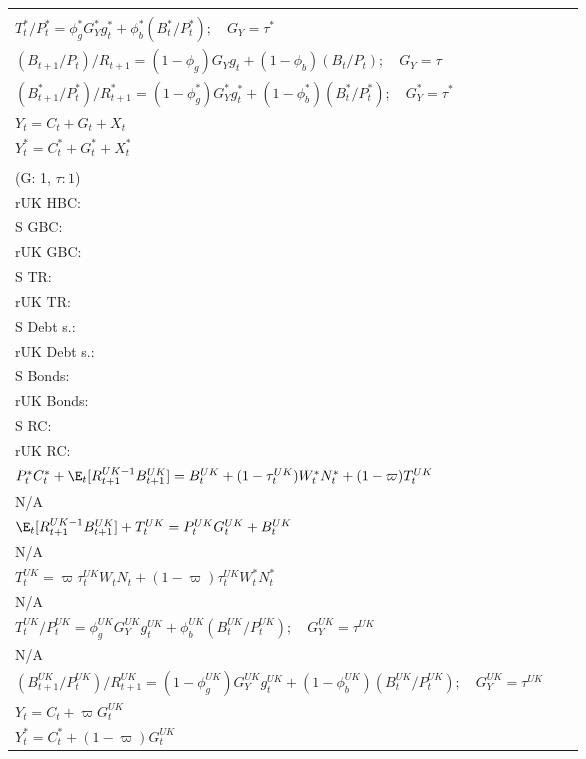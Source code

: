 \begin{table}[H]
\begin{tabular}{l|l c}
{        $T_t / P_t = \phi^*_g G_Y g_t + \phi^*_b(B_t / P_t); \quad G_Y = \tau$\\
        $T^*_t / P^*_t = \phi^*_g G^*_Y g^*_t + \phi^*_b(B^*_t / P^*_t); \quad G_Y = \tau^*$\\
        $(B_{t+1} / P_t) / R_{t+1} = (1-\phi_g) G_Y g_t + (1-\phi_b)(B_t / P_t); \quad G_Y = \tau$\\
        $(B^*_{t+1} / P^*_t) / R^*_{t+1} = (1-\phi^*_g) G^*_Y g^*_t + (1-\phi^*_b)(B^*_t / P^*_t); \quad G^*_Y = \tau^*$\\
        $Y_t = C_t + G_t + X_t$ \\
        $Y^*_t = C^*_t + G^*_t + X^*_t$
    }  \\
    \makecell{Scenario 4 \\ (G: 1, $\tau: 1$)} &  \makecell{S HBC: \\ rUK HBC: \\ S GBC: \\ rUK GBC: \\ S TR: \\ rUK TR: \\ S Debt s.:\\ rUK Debt s.:\\ S Bonds: \\ rUK Bonds: \\ S RC: \\ rUK RC:} & 
    \makecell{
        $P_t C_t + \E_t [{R^{UK-1}_{t+1}}B^{UK}_{t+1}] = B^{UK}_t + (1-\tau^{UK}_t)W_t N_t + \varpi T^{UK}_t$ \\
        $P^*_t C^*_t + \E_t [{R^{UK-1}_{t+1}}B^{UK}_{t+1}] = B^{UK}_t + (1-\tau^{UK}_t)W^*_t N^*_t + (1-\varpi)T^{UK}_t$ \\
        N/A \\
        $\E_t [{R^{UK-1}_{t+1}}B^{UK}_{t+1}] + T^{UK}_t = P^{UK}_tG^{UK}_t + B^{UK}_t$\\ 
        N/A \\
        $T^{UK}_t = \varpi\tau^{UK}_t W_t N_t + (1-\varpi)\tau^{UK}_t W^*_t N^*_t$ \\
        N/A\\
        $T^{UK}_t / P^{UK}_t = \phi^{UK}_g G^{UK}_Y g^{UK}_t + \phi^{UK}_b(B^{UK}_t / P^{UK}_t); \quad G^{UK}_Y = \tau^{UK}$\\
        N/A\\
        $(B^{UK}_{t+1} / P^{UK}_t) / R^{UK}_{t+1} = (1-\phi^{UK}_g) G^{UK}_Y g^{UK}_t + (1-\phi^{UK}_b)(B^{UK}_t / P^{UK}_t); \quad G^{UK}_Y = \tau^{UK}$\\
        $Y_t = C_t + \varpi G^{UK}_t$ \\
        $Y^*_t = C^*_t + (1-\varpi) G^{UK}_t$
    }  
    \end{tabular}
    \end{table}
